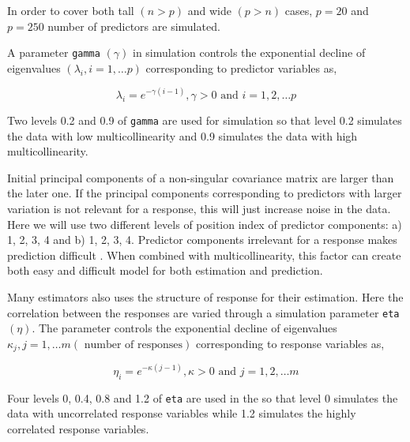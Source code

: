 \documentclass[12pt,3p,authoryear]{elsarticle}
\providecommand{\tightlist}{%
  \setlength{\itemsep}{0pt}\setlength{\parskip}{0pt}}
\begin{document}
\begin{description}
\tightlist
\item[\textbf{Number of predictors:}]
In order to cover both tall \((n>p)\) and wide \((p>n)\) cases,
\(p= 20\) and \(p= 250\) number of predictors are simulated.
\item[\textbf{Multicollinearity in predictor variables:}]
A parameter \texttt{gamma} \((\gamma)\) in simulation controls the
exponential decline of eigenvalues \((\lambda_i, i = 1, \ldots p)\)
corresponding to predictor variables as,

\begin{equation}
  \lambda_i = e^{-\gamma(i-1)}, \gamma > 0 \text{ and } i = 1, 2, \ldots p
  \label{eq:gamma}
  \end{equation}

Two levels 0.2 and 0.9 of \texttt{gamma} are used for simulation so that
level 0.2 simulates the data with low multicollinearity and 0.9
simulates the data with high multicollinearity.
\item[\textbf{Position of relevant components:}]
Initial principal components of a non-singular covariance matrix are
larger than the later one. If the principal components corresponding to
predictors with larger variation is not relevant for a response, this
will just increase noise in the data. Here we will use two different
levels of position index of predictor components: a) 1, 2, 3, 4 and b)
1, 2, 3, 4. Predictor components irrelevant for a response makes
prediction difficult \citep{Helland1994b}. When combined with
multicollinearity, this factor can create both easy and difficult model
for both estimation and prediction.
\item[\textbf{Correlation in response variables:}]
Many estimators also uses the structure of response for their
estimation. Here the correlation between the responses are varied
through a simulation parameter \texttt{eta} \((\eta)\). The parameter
controls the exponential decline of eigenvalues
\(\kappa_j, j = 1, \ldots m (\text{ number of responses})\)
corresponding to response variables as,

\begin{equation}
\eta_i = e^{-\kappa(j-1)}, \kappa > 0 \text{ and } j = 1, 2, \ldots m
\label{eq:eta}
\end{equation}

Four levels 0, 0.4, 0.8 and 1.2 of \texttt{eta} are used in the so that
level 0 simulates the data with uncorrelated response variables while
1.2 simulates the highly correlated response variables.
\end{description}
\end{document}
